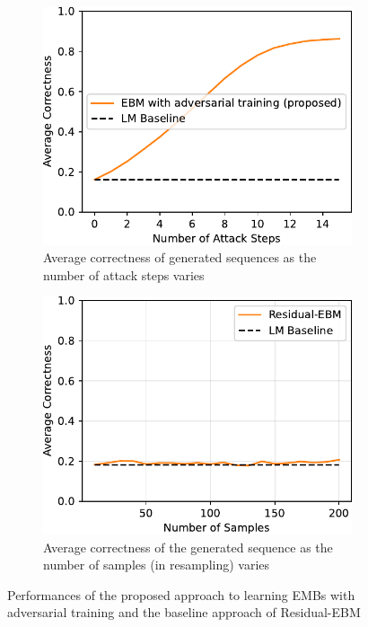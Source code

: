 \documentclass{article}
\begin{document}
\begin{figure}[h!]
  \centering
  \begin{subfigure}[b]{0.49\textwidth}
    \includegraphics[width=\textwidth]{adv-ebm}
    \caption{Average correctness of generated sequences as the number of attack steps varies}
    \label{fig:compare_a}
  \end{subfigure}
  \hfill %
  \begin{subfigure}[b]{0.49\textwidth}
    \includegraphics[width=\textwidth]{residualEBM.pdf}
    \caption{Average correctness of the generated sequence as the number of samples (in resampling) varies}
    \label{fig:compare_b}
  \end{subfigure}
  \caption{Performances of the proposed approach to learning EMBs with adversarial training and the baseline approach of Residual-EBM}
  \label{fig:compare}
\end{figure}
\end{document}
